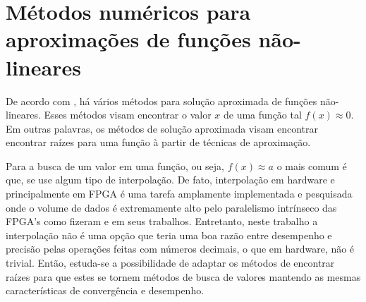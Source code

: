 







\section{Métodos numéricos para aproximações de funções não-lineares}\label{sec-metodos-convergencia}

De acordo com , há vários métodos para solução aproximada de funções não-lineares. Esses métodos visam encontrar o valor $x$ de uma função tal $f(x) \approx 0$. Em outras palavras, os métodos de solução aproximada visam encontrar encontrar raízes para uma função à partir de técnicas de aproximação. 

Para a busca de um valor em uma função, ou seja, $f(x) \approx a$ o mais comum é que, se use algum tipo de interpolação. De fato, interpolação em hardware e principalmente em FPGA é uma tarefa amplamente implementada e pesquisada onde o volume de dados é extremamente alto pelo paralelismo intrínseco das FPGA's como fizeram \cite{interp-video} e \cite{interp-fft} em seus trabalhos. Entretanto, neste trabalho a interpolação não é uma opção que teria uma boa razão entre desempenho e precisão pelas operações feitas com números decimais, o que em hardware, não é trivial. Então, estuda-se a possibilidade de adaptar os métodos de encontrar raízes para que estes se tornem métodos de busca de valores mantendo as mesmas características de convergência e desempenho.

